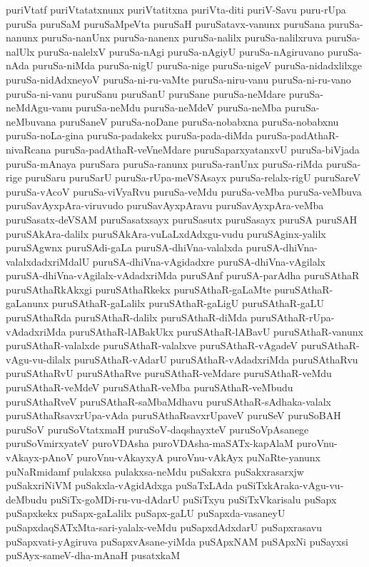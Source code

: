 {puriVtatf
puriVtatatxnunx
puriVtatitxna
puriVta-diti
puriV-Savu
puru-rUpa
puruSa
puruSaM
puruSaMpeVta
puruSaH
puruSatavx-vanunx
puruSana
puruSa-nanunx
puruSa-nanUnx
puruSa-nanenx
puruSa-nalilx
puruSa-nalilxruva
puruSa-nalUlx
puruSa-nalelxV
puruSa-nAgi
puruSa-nAgiyU
puruSa-nAgiruvano
puruSa-nAda
puruSa-niMda
puruSa-nigU
puruSa-nige
puruSa-nigeV
puruSa-nidadxlilxge
puruSa-nidAdxneyoV
puruSa-ni-ru-vaMte
puruSa-niru-vanu
puruSa-ni-ru-vano
puruSa-ni-vanu
puruSanu
puruSanU
puruSane
puruSa-neMdare
puruSa-neMdAgu-vanu
puruSa-neMdu
puruSa-neMdeV
puruSa-neMba
puruSa-neMbuvana
puruSaneV
puruSa-noDane
puruSa-nobabxna
puruSa-nobabxnu
puruSa-noLa-gina
puruSa-padakekx
puruSa-pada-diMda
puruSa-padAthaR-nivaRcana
puruSa-padAthaR-veVneMdare
puruSaparxyatanxvU
puruSa-biVjada
puruSa-mAnaya
puruSara
puruSa-ranunx
puruSa-ranUnx
puruSa-riMda
puruSa-rige
puruSaru
puruSarU
puruSa-rUpa-meVSAsayx
puruSa-relalx-rigU
puruSareV
puruSa-vAcoV
puruSa-viVyaRvu
puruSa-veMdu
puruSa-veMba
puruSa-veMbuva
puruSavAyxpAra-viruvudo
puruSavAyxpAravu
puruSavAyxpAra-veMba
puruSasatx-deVSAM
puruSasatxsayx
puruSasutx
puruSasayx
puruSA
puruSAH
puruSAkAra-dalilx
puruSAkAra-vuLaLxdAdxgu-vudu
puruSAginx-yalilx
puruSAgwnx
puruSAdi-gaLa
puruSA-dhiVna-valalxda
puruSA-dhiVna-valalxdadxriMdalU
puruSA-dhiVna-vAgidadxre
puruSA-dhiVna-vAgilalx
puruSA-dhiVna-vAgilalx-vAdadxriMda
puruSAnf
puruSA-parAdha
puruSAthaR
puruSAthaRkAkxgi
puruSAthaRkekx
puruSAthaR-gaLaMte
puruSAthaR-gaLanunx
puruSAthaR-gaLalilx
puruSAthaR-gaLigU
puruSAthaR-gaLU
puruSAthaRda
puruSAthaR-dalilx
puruSAthaR-diMda
puruSAthaR-rUpa-vAdadxriMda
puruSAthaR-lABakUkx
puruSAthaR-lABavU
puruSAthaR-vanunx
puruSAthaR-valalxde
puruSAthaR-valalxve
puruSAthaR-vAgadeV
puruSAthaR-vAgu-vu-dilalx
puruSAthaR-vAdarU
puruSAthaR-vAdadxriMda
puruSAthaRvu
puruSAthaRvU
puruSAthaRve
puruSAthaR-veMdare
puruSAthaR-veMdu
puruSAthaR-veMdeV
puruSAthaR-veMba
puruSAthaR-veMbudu
puruSAthaRveV
puruSAthaR-saMbaMdhavu
puruSAthaR-sAdhaka-valalx
puruSAthaRsavxrUpa-vAda
puruSAthaRsavxrUpaveV
puruSeV
puruSoBAH
puruSoV
puruSoVtatxmaH
puruSoV-daqshayxteV
puruSoVpAsanege
puruSoVmirxyateV
puroVDAsha
puroVDAsha-maSATx-kapAlaM
puroVnu-vAkayx-pAnoV
puroVnu-vAkayxyA
puroVnu-vAkAyx
puNaRte-yanunx
puNaRmidamf
pulakxsa
pulakxsa-neMdu
puSakxra
puSakxrasarxjw
puSakxriNiVM
puSakxla-vAgidAdxga
puSaTxLAda
puSiTxkAraka-vAgu-vu-deMbudu
puSiTx-goMDi-ru-vu-dAdarU
puSiTxyu
puSiTxVkarisalu
puSapx
puSapxkekx
puSapx-gaLalilx
puSapx-gaLU
puSapxda-vasaneyU
puSapxdaqSATxMta-sari-yalalx-veMdu
puSapxdAdxdarU
puSapxrasavu
puSapxvati-yAgiruva
puSapxvAsane-yiMda
puSApxNAM
puSApxNi
puSayxsi
puSAyx-sameV-dha-mAnaH
pusatxkaM
}
